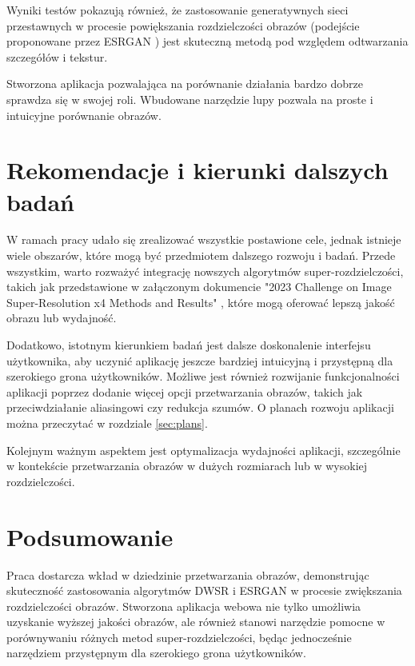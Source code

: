Wyniki testów pokazują również, że zastosowanie generatywnych sieci przestawnych w procesie powiększania rozdzielczości obrazów (podejście proponowane przez ESRGAN \cite{wang2018esrgan}) jest skuteczną metodą pod względem odtwarzania szczegółów i tekstur. 


Stworzona aplikacja pozwalająca na porównanie działania bardzo dobrze sprawdza się w swojej roli. Wbudowane narzędzie lupy pozwala na proste i intuicyjne porównanie obrazów. 



\section{Rekomendacje i kierunki dalszych badań}

W ramach pracy udało się zrealizować wszystkie postawione cele, jednak istnieje wiele obszarów, które mogą być przedmiotem dalszego rozwoju i badań. Przede wszystkim, warto rozważyć integrację nowszych algorytmów super-rozdzielczości, takich jak przedstawione w załączonym dokumencie "2023 Challenge on Image Super-Resolution x4 Methods and Results" \cite{Li_2023_CVPR}, które mogą oferować lepszą jakość obrazu lub wydajność.

Dodatkowo, istotnym kierunkiem badań jest dalsze doskonalenie interfejsu użytkownika, aby uczynić aplikację jeszcze bardziej intuicyjną i przystępną dla szerokiego grona użytkowników. Możliwe jest również rozwijanie funkcjonalności aplikacji poprzez dodanie więcej opcji przetwarzania obrazów, takich jak przeciwdziałanie aliasingowi czy redukcja szumów. O planach rozwoju aplikacji można przeczytać w rozdziale \ref{sec:plans}.

Kolejnym ważnym aspektem jest optymalizacja wydajności aplikacji, szczególnie w kontekście przetwarzania obrazów w dużych rozmiarach lub w wysokiej rozdzielczości. 

\section*{Podsumowanie}

Praca dostarcza wkład w dziedzinie przetwarzania obrazów, demonstrując skuteczność zastosowania algorytmów DWSR i ESRGAN w procesie zwiększania rozdzielczości obrazów. Stworzona aplikacja webowa nie tylko umożliwia uzyskanie wyższej jakości obrazów, ale również stanowi narzędzie pomocne w porównywaniu różnych metod super-rozdzielczości, będąc jednocześnie narzędziem przystępnym dla szerokiego grona użytkowników.